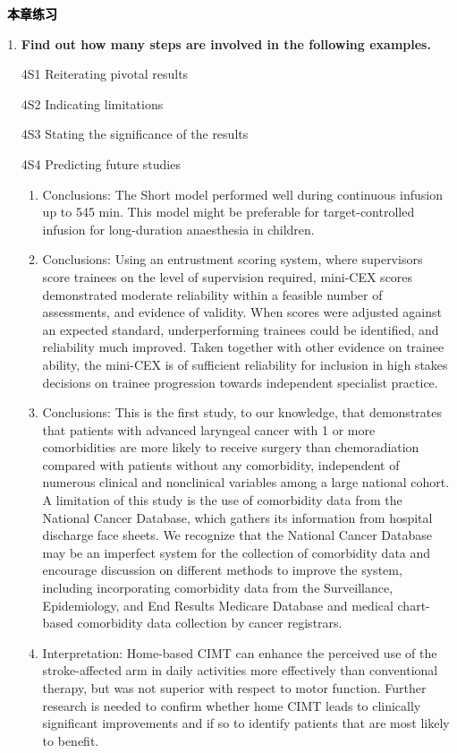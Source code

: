 \documentclass[a4paper]{ctexbook}
\newenvironment{problemset}[1][本章练习]{
  \begin{center}
    \phantomsection\addcontentsline{toc}{section}{\texorpdfstring{本章练习}{Exercice}}
    \markright{#1}
    \textcolor{black}{\Large\bfseries\adftripleflourishleft~#1~\adftripleflourishright}
  \end{center}
  \begin{enumerate}}{
  \end{enumerate}}
\begin{document}
\begin{problemset}
  \item \textbf{Find out how many steps are involved in the following examples.}
  
  \hspace*{2em}4S1 Reiterating pivotal results

  \hspace*{2em}4S2 Indicating limitations 
  
  \hspace*{2em}4S3 Stating the significance of the results

  \hspace*{2em}4S4 Predicting future studies

  \begin{enumerate}
    \item Conclusions: The Short model performed well during continuous infusion up to 545 min. This model might be preferable for target-controlled infusion for long-duration anaesthesia in children.
    \item Conclusions: Using an entrustment scoring system, where supervisors score trainees on the level of supervision required, mini-CEX scores demonstrated moderate reliability within a feasible number of assessments, and evidence of validity. When scores were adjusted against an expected standard, underperforming trainees could be identified, and reliability much improved. Taken together with other evidence on trainee ability, the mini-CEX is of sufficient reliability for inclusion in high stakes decisions on trainee progression towards independent specialist practice.
    \item Conclusions: This is the first study, to our knowledge, that demonstrates that patients with advanced laryngeal cancer with 1 or more comorbidities are more likely to receive surgery than chemoradiation compared with patients without any comorbidity, independent of numerous clinical and nonclinical variables among a large national cohort. A limitation of this study is the use of comorbidity data from the National Cancer Database, which gathers its information from hospital discharge face sheets. We recognize that the National Cancer Database may be an imperfect system for the collection of comorbidity data and encourage discussion on different methods to improve the system, including incorporating comorbidity data from the Surveillance, Epidemiology, and End Results Medicare Database and medical chart-based comorbidity data collection by cancer registrars.
    \item Interpretation: Home-based CIMT can enhance the perceived use of the stroke-affected arm in daily activities more effectively than conventional therapy, but was not superior with respect to motor function. Further research is needed to confirm whether home CIMT leads to clinically significant improvements and if so to identify patients that are most likely to benefit.
  \end{enumerate}


\end{problemset}
\end{document}
